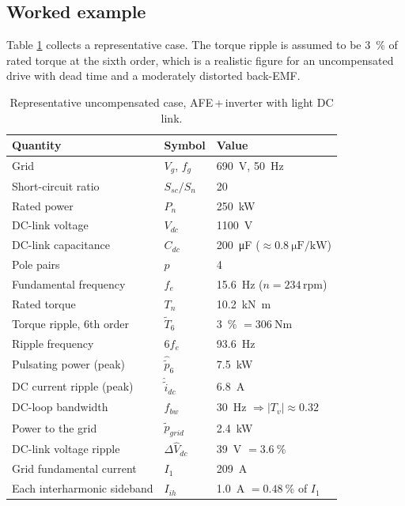 \documentclass[11pt,a4paper]{article}
\begin{document}
\subsection{Worked example}

Table \ref{tab:case} collects a representative case. The torque ripple is
assumed to be \SI{3}{\percent} of rated torque at the sixth order, which is a
realistic figure for an uncompensated drive with dead time and a moderately
distorted back-EMF.

\begin{table}[h]
\centering
\small
\begin{tabular}{lll}
\toprule
Quantity & Symbol & Value \\
\midrule
Grid & $V_{g}$, $f_{g}$ & \SI{690}{\volt}, \SI{50}{\hertz} \\
Short-circuit ratio & $S_{sc}/S_{n}$ & 20 \\
Rated power & $P_{n}$ & \SI{250}{\kilo\watt} \\
DC-link voltage & $V_{dc}$ & \SI{1100}{\volt} \\
DC-link capacitance & $C_{dc}$ & \SI{200}{\micro\farad} ($\approx\SI{0.8}{\micro\farad\per\kilo\watt}$) \\
Pole pairs & $p$ & 4 \\
Fundamental frequency & $f_{e}$ & \SI{15.6}{\hertz} ($n=234$\,rpm) \\
Rated torque & $T_{n}$ & \SI{10.2}{\kilo\newton\metre} \\
\midrule
Torque ripple, 6th order & $\tilde{T}_{6}$ & \SI{3}{\percent} $=\SI{306}{\newton\metre}$ \\
Ripple frequency & $6f_{e}$ & \SI{93.6}{\hertz} \\
Pulsating power (peak) & $\hat{\tilde{p}}_{6}$ & \SI{7.5}{\kilo\watt} \\
DC current ripple (peak) & $\hat{\tilde{i}}_{dc}$ & \SI{6.8}{\ampere} \\
DC-loop bandwidth & $f_{bw}$ & \SI{30}{\hertz} $\Rightarrow |T_{v}|\approx0.32$ \\
Power to the grid & $\tilde{p}_{grid}$ & \SI{2.4}{\kilo\watt} \\
DC-link voltage ripple & $\Delta\hat{V}_{dc}$ & \SI{39}{\volt} $=\SI{3.6}{\percent}$ \\
Grid fundamental current & $I_{1}$ & \SI{209}{\ampere} \\
Each interharmonic sideband & $I_{ih}$ & \SI{1.0}{\ampere} $=\SI{0.48}{\percent}$ of $I_{1}$ \\
\bottomrule
\end{tabular}
\caption{Representative uncompensated case, AFE\,+\,inverter with light DC link.}
\label{tab:case}
\end{table}
\end{document}
